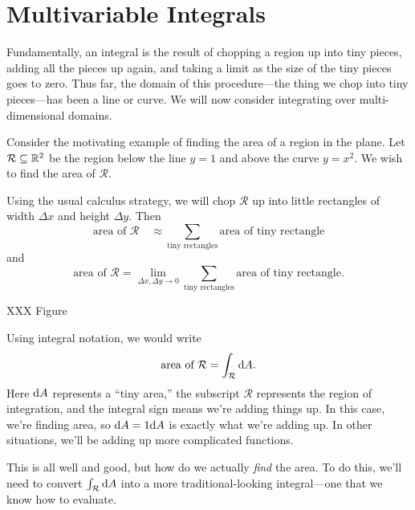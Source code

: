 \section{Multivariable Integrals}

Fundamentally, an integral is the result of chopping a region up into tiny
pieces, adding all the pieces up again, and taking a limit as the size of
the tiny pieces goes to zero.  Thus far, the domain of this procedure---the
thing we chop into tiny pieces---has been a line or curve.  We will now consider
integrating over multi-dimensional domains.

Consider the motivating example of finding the area of a region in the plane.
Let $\mathcal R\subseteq \mathbb{R}^2$ be the region below the line $y=1$ and above the
curve $y=x^2$.  We wish to find the area of $\mathcal R$.

Using the usual calculus strategy, we will chop $\mathcal R$ up into little rectangles
of width $\Delta x$ and height $\Delta y$.  Then
\[
	\text{area of }\mathcal R \quad\approx \sum_{\text{tiny rectangles}}\text{area of tiny rectangle}
\]
and
\[
	\text{area of }\mathcal R =\lim_{\Delta x,\Delta y\to 0} \sum_{\text{tiny rectangles}}\text{area of tiny rectangle}.
\]

XXX Figure

Using integral notation, we would write
\[
	\text{area of }\mathcal R=\int_{\mathcal R} \mathrm{d} A.
\]
Here $\mathrm{d} A$ represents a ``tiny area,'' the subscript $\mathcal R$ represents the region of integration,
and the integral sign means we're adding things up.  In this case, we're finding area, so $\mathrm{d} A=1\mathrm{d} A$ is
exactly what we're adding up.  In other situations, we'll be adding up more complicated functions.

This is all well and good, but how do we actually \emph{find} the area.  To do this, we'll
need to convert $\int_{\mathcal R}\mathrm{d} A$ into a more traditional-looking integral---one that we
know how to evaluate.

